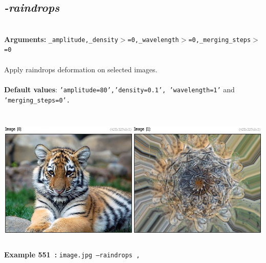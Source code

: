 \documentclass[a4paper,11pt,twoside]{book}
\begin{document}
\subsection{\emph{-raindrops} }\vspace*{-0.5em}
~\\\textbf{Arguments: } 
{\small \texttt{\_amplitude,\_density$>$=0,\_wavelength$>$=0,\_merging\_steps$>$=0}}\\~\\
Apply raindrops deformation on selected images.
~\\~\\\textbf{Default values}: {\small \texttt{'amplitude=80','density=0.1', 'wavelength=1'} and \texttt{'merging\_steps=0'.}}
\begin{center}\includegraphics[keepaspectratio=true,height=7cm,width=\textwidth]{img/gmic_def551.jpg}\\
{\footnotesize \textbf{Example 551~:} \texttt{image.jpg --raindrops ,}}
\end{center}
\end{document}
